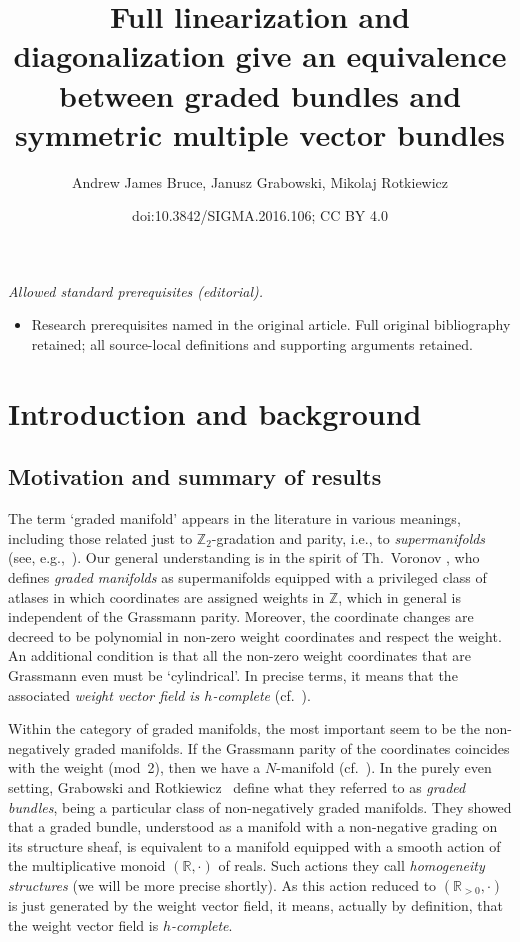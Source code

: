 \documentclass[10pt,a4paper]{amsart}
\title{Full linearization and diagonalization give an equivalence between graded bundles and symmetric multiple vector bundles}
\author{Andrew James Bruce, Janusz Grabowski, Mikolaj Rotkiewicz}
\date{doi:10.3842/SIGMA.2016.106; CC BY 4.0}
\newcommand{\R}{{\mathbb R}}
\newcommand{\Zet}{{\mathbb Z}}
\numberwithin{equation}{section}
\begin{document}
\maketitle
\noindent\textit{Allowed standard prerequisites (editorial).}\begin{itemize}
\item Research prerequisites named in the original article. Full original bibliography retained; all source-local definitions and supporting arguments retained.
\end{itemize}\medskip
\section{Introduction and background}\label{sec:Intro}
\subsection{Motivation and summary of results}

The term `graded manifold' appears in the literature in various meanings, including those related just to $\mathbb{Z}_2$-gradation and parity, i.e., to \emph{supermanifolds} (see, e.g.,~\cite{Kostant:1977}). Our general under\-standing is in the spirit of Th.~Voronov \cite{Voronov:2001qf}, who def\/ines \emph{graded manifolds} as supermanifolds equipped with a privileged class of atlases in which coordinates are assigned weights in $\Zet$, which in ge\-neral is independent of the Grassmann parity. Moreover, the coordinate changes are decreed to be polynomial in non-zero weight coordinates and respect the weight. An additional condition is that all the non-zero weight coordinates that are Grassmann even must be `cylindrical'. In precise terms, it means that the associated \emph{weight vector field is $h$-complete} (cf.~\cite{Grabowski2013}).

Within the category of graded manifolds, the most important seem to be the non-negatively graded manifolds. If the Grassmann parity of the coordinates coincides with the weight (mod~2), then we have a $N$-manifold (cf.~\cite{Roytenberg:2002,Severa:2005}). In the purely even setting, Grabowski and Rotkie\-wicz~\cite{JG_MR_higher_vb} def\/ine what they referred to as \emph{graded bundles}, being a particular class of non-negatively graded manifolds. They showed that a graded bundle, understood as a manifold with a non-negative grading on its structure sheaf, is equivalent to a manifold equipped with a smooth action of the multiplicative monoid $(\R,\cdot)$ of reals. Such actions they call \emph{homogeneity structures} (we will be more precise shortly). As this action reduced to $(\R_{>0},\cdot)$ is just generated by the weight vector f\/ield, it means, actually by def\/inition, that the weight vector f\/ield is \emph{$h$-complete}.
\end{document}
